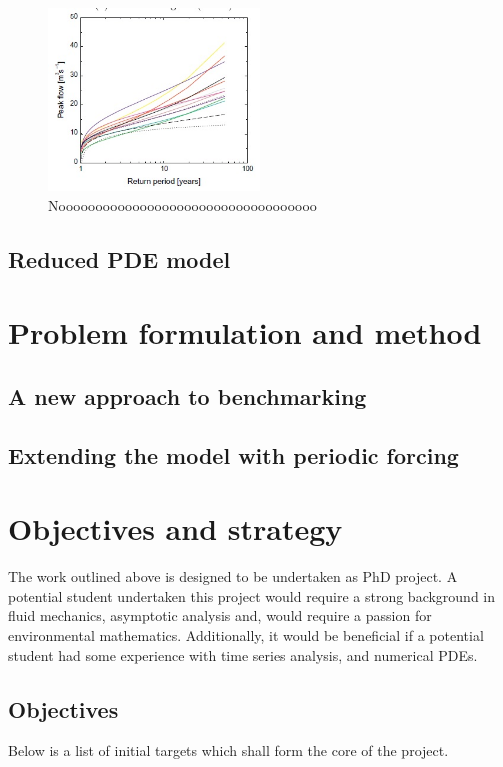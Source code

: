 \documentclass[11pt]{article}
\begin{document}
\begin{figure}[H]%
    \centering
    \includegraphics[width=0.5\textwidth]{Figs/concept_out.jpg}
    \caption{Nooooooooooooooooooooooooooooooooooo}
    \label{fig:concept_out}
\end{figure}




\subsection{Reduced PDE model}


\section{Problem formulation and method}

\subsection{A new approach to benchmarking}


\subsection{Extending the model with periodic forcing}

\section{Objectives and strategy}

The work outlined above is designed to be undertaken as PhD project. A potential student undertaken this project would require a strong background in fluid mechanics, asymptotic analysis and, would require a passion for environmental mathematics. 
Additionally, it would be beneficial if a potential student had some experience with time series analysis, and numerical PDEs.

\subsection{Objectives}
Below is a list of initial targets which shall form the core of the project.
\end{document}
